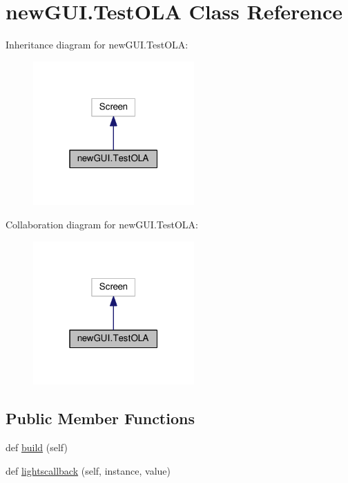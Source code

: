 \hypertarget{classnewGUI_1_1TestOLA}{}\section{new\+G\+U\+I.\+Test\+O\+LA Class Reference}
\label{classnewGUI_1_1TestOLA}


Inheritance diagram for new\+G\+U\+I.\+Test\+O\+LA\+:\nopagebreak
\begin{figure}[H]
\begin{center}
\leavevmode
\includegraphics[width=175pt]{classnewGUI_1_1TestOLA__inherit__graph}
\end{center}
\end{figure}


Collaboration diagram for new\+G\+U\+I.\+Test\+O\+LA\+:\nopagebreak
\begin{figure}[H]
\begin{center}
\leavevmode
\includegraphics[width=175pt]{classnewGUI_1_1TestOLA__coll__graph}
\end{center}
\end{figure}
\subsection*{Public Member Functions}
\begin{DoxyCompactItemize}
\item 
def \hyperlink{classnewGUI_1_1TestOLA_a80118c064d3ed89d24f0ff76e847bed9}{build} (self)
\item 
def \hyperlink{classnewGUI_1_1TestOLA_a3d1b265bdb9d7044c3e9a0d45ee36d0b}{lightscallback} (self, instance, value)
\end{DoxyCompactItemize}
